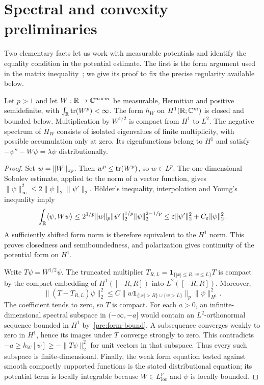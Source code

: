 \section{Spectral and convexity preliminaries}\label{pre:section}

Two elementary facts let us work with measurable potentials and identify
the equality condition in the potential estimate. The first is the form
argument used in the matrix inequality~\cite[Lemma~7.1]{MLT}; we give its
proof to fix the precise regularity available below.

\begin{lemma}\label{pre:spectral}
Let $p>1$ and let $W:\mathbb R\to\mathbb C^{m\times m}$ be measurable, Hermitian and
positive semidefinite, with $\int_\mathbb R\operatorname{tr}(W^p)<\infty$.
The form $h_W$ on $H^1(\mathbb R;\mathbb C^m)$ is closed and bounded below.
Multiplication by $W^{1/2}$ is compact from $H^1$ to $L^2$.
The negative spectrum of $H_W$ consists of isolated eigenvalues of finite
multiplicity, with possible accumulation only at zero. Its eigenfunctions
belong to $H^1$ and satisfy $-\psi''-W\psi=\lambda\psi$ distributionally.
\end{lemma}

\begin{proof}
Set $w=\|W\|_{\operatorname{op}}$. Then $w^p\le\operatorname{tr}(W^p)$, so $w\in L^p$.
The one-dimensional Sobolev estimate, applied to the norm of a vector
function, gives $\|\psi\|_\infty^2\le2\|\psi\|_2\|\psi'\|_2$.
H\"older's inequality, interpolation and Young's inequality imply
\begin{equation}\label{pre:form-bound}
 \int_\mathbb R\langle\psi,W\psi\rangle
 \le 2^{1/p}\|w\|_p\|\psi'\|_2^{1/p}\|\psi\|_2^{2-1/p}
 \le \varepsilon\|\psi'\|_2^2+C_\varepsilon\|\psi\|_2^2.
\end{equation}
A sufficiently shifted form norm is therefore equivalent to the $H^1$
norm. This proves closedness and semiboundedness, and polarization gives
continuity of the potential form on $H^1$.

Write $T\psi=W^{1/2}\psi$. The truncated multiplier
$T_{R,L}=\mathbf1_{\{|x|\le R,\,w\le L\}}T$ is compact by the compact
embedding of $H^1([-R,R])$ into $L^2([-R,R])$. Moreover,
\[
 \|(T-T_{R,L})\psi\|_2^2
 \le C\|w\mathbf1_{\{|x|>R\}\cup\{w>L\}}\|_p\|\psi\|_{H^1}^2.
\]
The coefficient tends to zero, so $T$ is compact.
For each $a>0$, an infinite-dimensional spectral subspace in
$(-\infty,-a]$ would contain an $L^2$-orthonormal sequence bounded in
$H^1$ by~\eqref{pre:form-bound}. A subsequence converges weakly to zero
in $H^1$, hence its images under $T$ converge strongly to zero. This
contradicts
$-a\ge h_W[\psi]\ge-\|T\psi\|_2^2$ for unit vectors in that subspace.
Thus every such subspace is finite-dimensional. Finally, the weak form
equation tested against smooth compactly supported functions is the stated
distributional equation; its potential term is locally integrable because
$W\in L^p_{\mathrm{loc}}$ and $\psi$ is locally bounded.
\end{proof}

